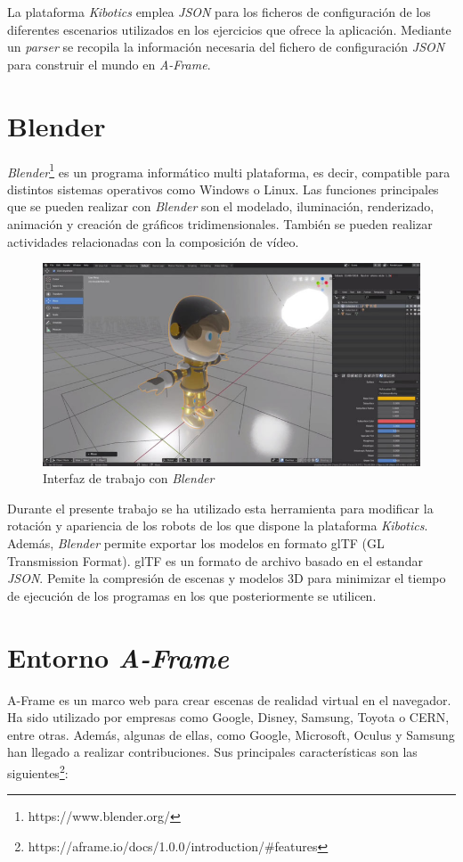 La plataforma \textit{Kibotics} emplea \textit{JSON} para los ficheros de configuración de los diferentes escenarios utilizados en los ejercicios que ofrece la aplicación. Mediante un \textit{parser} se recopila la información necesaria del fichero de configuración \textit{JSON} para construir el mundo en \textit{A-Frame}.

\section{Blender}
\textit{Blender}\footnote{https://www.blender.org/} es un programa informático multi plataforma, es decir, compatible para distintos sistemas operativos como Windows o Linux. Las funciones principales que se pueden realizar con \textit{Blender} son el modelado, iluminación, renderizado, animación y creación de gráficos tridimensionales. También se pueden realizar actividades relacionadas con la composición de vídeo. 

\begin{figure}[h!]
    \centering
    \includegraphics[scale=0.7]{blender.PNG} 
    \caption{Interfaz de trabajo con \textit{Blender}}
    \label{fig:blender}
\end{figure}

Durante el presente trabajo se ha utilizado esta herramienta para modificar la rotación y apariencia de los robots de los que dispone la plataforma \textit{Kibotics}. Además, \textit{Blender} permite exportar los modelos en formato glTF (GL Transmission Format). glTF es un formato de archivo basado en el estandar \textit{JSON}. Pemite la compresión de escenas y modelos 3D para minimizar el tiempo de ejecución de los programas en los que posteriormente se utilicen.

\section{Entorno \textit{A-Frame}}
A-Frame es un marco web para crear escenas de realidad virtual en el navegador. Ha sido utilizado por empresas como Google, Disney, Samsung, Toyota o CERN, entre otras. Además, algunas de ellas, como Google, Microsoft, Oculus y Samsung han llegado a realizar contribuciones. Sus principales características son las siguientes\footnote{https://aframe.io/docs/1.0.0/introduction/#features}:

